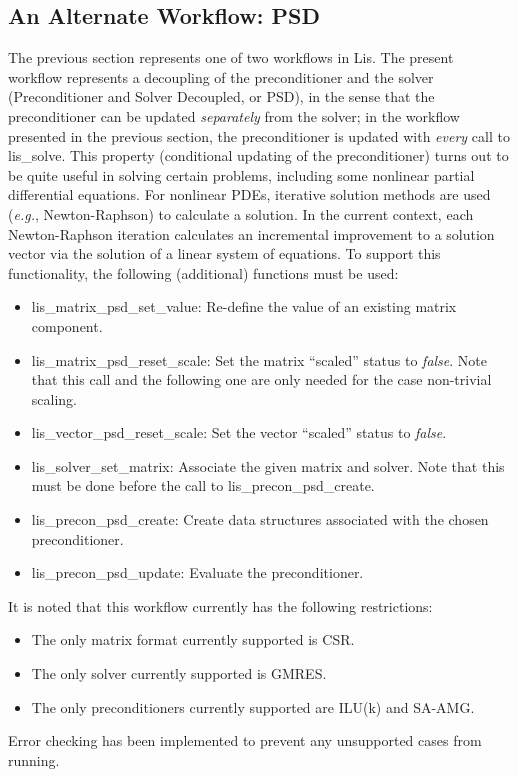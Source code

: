 \documentclass[a4paper]{article}
\begin{document}
\subsection{An Alternate Workflow: PSD}
\label{subsec:psd}
The previous section represents one of two workflows in Lis.  The present
workflow represents a decoupling of the preconditioner and the solver
(Preconditioner and Solver Decoupled, or PSD), in the sense that the
preconditioner can be updated \textit{separately} from the solver; in the
workflow presented in the previous section, the preconditioner is updated with
\textit{every} call to lis\_solve.  This property (conditional updating of the
preconditioner) turns out to be quite useful in solving certain problems,
including some nonlinear partial differential equations.  For nonlinear PDEs,
iterative solution methods are used (\textit{e.g.}, Newton-Raphson) to
calculate a solution.  In the current context, each Newton-Raphson iteration
calculates an incremental improvement to a solution vector via the solution of
a linear system of equations.  To support this functionality, the following
(additional) functions must be used:
%
\begin{itemize}
\item lis\_matrix\_psd\_set\_value: Re-define the value of an existing matrix component.
\item lis\_matrix\_psd\_reset\_scale: Set the matrix ``scaled'' status to
\textit{false}.  Note that this call and the following one are only needed for
the case non-trivial scaling.
\item lis\_vector\_psd\_reset\_scale: Set the vector ``scaled'' status to \textit{false}.
\item lis\_solver\_set\_matrix: Associate the given matrix and solver.  Note that this must be done
before the call to lis\_precon\_psd\_create.
\item lis\_precon\_psd\_create: Create data structures associated with the chosen preconditioner.
\item lis\_precon\_psd\_update: Evaluate the preconditioner.
\end{itemize}
%
It is noted that this workflow currently has the following restrictions:
%
\begin{itemize}
\item The only matrix format currently supported is CSR.
\item The only solver currently supported is GMRES.
\item The only preconditioners currently supported are ILU(k) and SA-AMG.
\end{itemize}
%
Error checking has been implemented to prevent any unsupported cases from
running.
\end{document}
